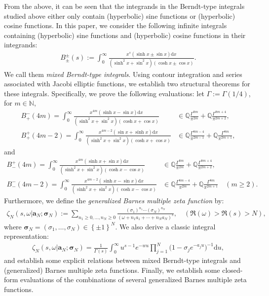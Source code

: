\documentclass[11pt]{article}
\def\N{\mathbb{N}}
\theoremstyle{plain}
\theoremstyle{definition}
\begin{document}
From the above, it can be seen that the integrands in the Berndt-type integrals studied above either only contain (hyperbolic) sine functions or (hyperbolic) cosine functions.
In this paper, we consider the following infinite integrals containing (hyperbolic) sine functions and (hyperbolic) cosine functions in their integrands:
\begin{align}
B^{\pm }_{\pm}(s):=\int_0^{\infty}{\frac{x^s\left( \sinh x\pm \sin x \right) \mathrm{d}x}{\left(\sinh ^2x+\sin ^2x\right) \left( \cosh x\pm \cos x\right)}}.
\end{align}
We call them \emph{mixed Berndt-type integrals}. Using contour integration and series associated with Jacobi elliptic functions, we establish two structural theorems for these integrals. Specifically,  we prove the following evaluations: let $\Gamma:=\Gamma(1/4)$, for $m\in \N$,
\begin{align}
B^{- }_{+}(4m)=\int_0^{\infty}{\frac{x^{4m}\left( \sinh x-\sin x \right) \mathrm{d}x}{\left( \sinh ^2x+\sin ^2x \right)\left( \cosh x+\cos x \right)}}&\in \mathbb{Q} \frac{\Gamma ^{8m}}{\pi ^{2m}}+\mathbb{Q} \frac{\Gamma ^{8m+4}}{\pi ^{2m+2}},
\\
B^{+}_{+}(4m-2)=\int_0^{\infty}{\frac{x^{4m-2}\left( \sin x+\sinh x \right) \mathrm{d}x}{\left(\sinh ^2x+\sin ^2x \right) \left(\cosh x+\cos x \right)}}&\in \mathbb{Q} \frac{\Gamma ^{8m-4}}{\pi ^{2m-1}}+\mathbb{Q} \frac{\Gamma ^{8m}}{\pi ^{2m+1}},
  \end{align}
  and
\begin{align}
B^{+}_{-}(4m)=\int_0^{\infty}{\frac{x^{4m}\left( \sinh x+\sin x \right) \mathrm{d}x}{\left(\sinh ^2x+\sin ^2x \right) \left( \cosh x-\cos x \right)}}&\in \mathbb{Q} \frac{\Gamma ^{8m}}{\pi ^{2m}}+\mathbb{Q} \frac{\Gamma ^{8m+4}}{\pi ^{2m+2}},
\\
B^{-}_{-}(4m-2)=\int_0^{\infty}{\frac{x^{4m-2}\left( \sinh x-\sin x \right) \mathrm{d}x}{\left(\sinh ^2x+\sin ^2x \right) \left(\cosh x-\cos x \right)}}&\in \mathbb{Q} \frac{\Gamma ^{8m-4}}{\pi ^{2m}}+\mathbb{Q} \frac{\Gamma ^{8m}}{\pi ^{2m+1}}\quad (m\ge 2).
  \end{align}
Furthermore, we define the \emph{generalized Barnes multiple zeta function} by:
 \begin{align*}
 \zeta _N(s,\omega |\mathbf{a}_N;\boldsymbol{\sigma }_N):=\sum_{n_1\ge 0,...,n_N\ge 0}{\frac{\left( \sigma _1 \right) ^{n_1}\cdots \left( \sigma _N \right) ^{n_N}}{(\omega +n_1a_1+\cdots +n_Na_N)^s},}\quad (\Re (\omega )>\Re (s)>N),
\end{align*}
where $\boldsymbol{\sigma }_N=\left( \sigma _1,\ldots,\sigma _N \right) \in \left\{ \pm 1 \right\} ^N$. We also derive a classic integral representation:
\begin{align*}
\zeta _N(s,\omega |\mathbf{a}_N;\boldsymbol{\sigma }_N)=\frac{1}{\Gamma \left( s \right)}\int_0^{\infty}{u^{s-1}}e^{-wu}\prod_{j=1}^N{(}1-\sigma _je^{-a_ju})^{-1}\mathrm{d}u,
\end{align*}
and establish some explicit relations between  mixed Berndt-type integrals and (generalized) Barnes multiple zeta functions. Finally, we establish some closed-form  evaluations of the combinations of several generalized Barnes multiple zeta functions.
\end{document}
